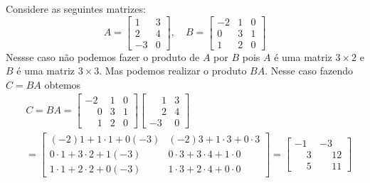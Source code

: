 \documentclass{beamer}
\begin{document}
  \begin{frame}
    \begin{exemplo}
      Considere as seguintes matrizes: 
      \[
        A = \begin{bmatrix}
          1 & 3\\
          2 & 4\\
          -3 & 0
        \end{bmatrix},\quad
        B = \begin{bmatrix}
          -2 & 1 & 0\\
          0 & 3 & 1\\
          1 & 2 & 0
        \end{bmatrix}
      \]
      Nessse caso não podemos fazer o produto de $A$ por $B$ pois $A$ é uma matriz $3 \times 2$ e $B$ é uma matriz $3 \times 3$. 
      Mas podemos realizar o produto $BA$. Nesse caso fazendo $C = BA$ obtemos
      \begin{eqnarray*}
        &C = BA = \begin{bmatrix}
          -2 & 1 & 0\\
          \phantom{-}0 & 3 & 1\\
          \phantom{-}1 & 2 & 0
        \end{bmatrix}\begin{bmatrix}
          \phantom{-}1 & 3\\
          \phantom{-}2 & 4\\
          -3 & 0
        \end{bmatrix} \\
        &= \begin{bmatrix}
          (-2)1 + 1\cdot 1 + 0(-3) & (-2)3 + 1\cdot 3 + 0\cdot 3\\
          0\cdot 1 + 3\cdot 2 + 1(-3) & 0\cdot 3 + 3\cdot 4 + 1\cdot 0\\
          1 \cdot 1 + 2 \cdot 2 + 0(-3) & 1 \cdot 3 + 2 \cdot 4 + 0\cdot 0
        \end{bmatrix}
        = \begin{bmatrix}
          -1 & -3\\
          \phantom{-}3 & \phantom{-}12\\
          \phantom{-}5 & \phantom{-}11
        \end{bmatrix}
      \end{eqnarray*}
    \end{exemplo}
  \end{frame}
\end{document}
